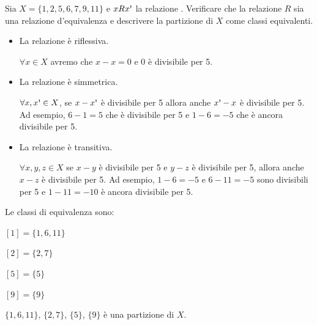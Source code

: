 \begin{esercizio}
    Sia $X = \{ 1,2,5,6,7,9,11 \}$ e $xR\hspace*{0.01cm}x\text{\textquotesingle}$ la relazione . Verificare che la relazione $R$ sia una relazione d'equivalenza e descrivere la partizione di $X$ come classi equivalenti.
\end{esercizio}
\begin{soluzione}
    \begin{itemize}\setlength\itemsep{1em}
		\item La relazione è riflessiva. 
		
		$\forall x \in X$ avremo che $x-x = 0$ e 0 è divisibile per 5.
		
		
		\item La relazione è simmetrica. 
		
	$\forall x,x\text{\textquotesingle} \in X$, se $x-x\text{\textquotesingle}$ è divisibile per 5 allora anche $x\text{\textquotesingle}-x$ è divisibile per 5.
	Ad esempio, $6-1 = 5$ che è divisibile per 5 e $1-6 = -5$ che è ancora divisibile per 5.
		
		
		\item La relazione è transitiva. 
		
		$\forall x,y,z \in X$ se $x-y$ è divisibile per 5 e $y-z$ è divisibile per 5, allora anche $x-z$ è divisibile per 5. 
		Ad esempio, $1-6 = -5$ e $6-11 = -5$ sono divisibili per 5 e $1-11 = -10$ è ancora divisibile per 5.   
		
	\end{itemize}
	
	\noindent Le classi di equivalenza sono: 
	
	\medskip 
	
	$[1] = \{ 1,6,11 \}$
	
	$[2] = \{2,7 \}$
	
	$[5] = \{ 5 \}$
	
	$[9] = \{ 9 \}$
	
	\medskip 
	
	\noindent $\{ 1,6,11 \}$, $\{2,7 \}$, $\{ 5 \}$, $\{ 9 \}$ è una partizione di $X$.\\
	\vspace{0.10cm}
\end{soluzione}

